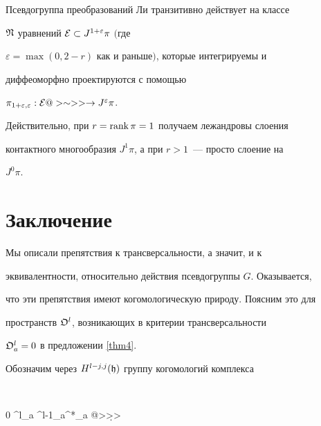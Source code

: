 \begin{prop}


Псевдогруппа преобразований Ли транзитивно действует на классе


$\frak{N}$ уравнений ${\cal E}\subset J^{1+\varepsilon}\pi$ $($где


$\varepsilon=\max(0,2-r)$ как и раньше$)$, которые интегрируемы и


диффеоморфно проектируются с помощью


$\pi_{1+\varepsilon,\varepsilon}:\E@>\sim>>\to J^\varepsilon\pi$.


\end{prop}





\begin{pf}


Действительно, при $r=\operatorname{rank}\pi=1$ получаем лежандровы слоения


контактного многообразия $J^1\pi$, а при $r>1$~--- просто слоение на


$J^0\pi$.


\end{pf}








\section{Заключение}





Мы описали препятствия к трансверсальности, а значит, и к


эквивалентности, относительно действия псевдогруппы $G$. Оказывается,


что эти препятствия имеют когомологическую природу. Поясним это для


пространств ${\frak O}^l$, возникающих в критерии трансверсальности


${\frak O}^l_a=0$ в предложении \ref{thm4}.





Обозначим через $H^{l-j,j}({\frak h})$ группу когомологий комплекса


$$




0 ^l_a ^{l-1}_a\ot\tf^*_a @>\d>>


